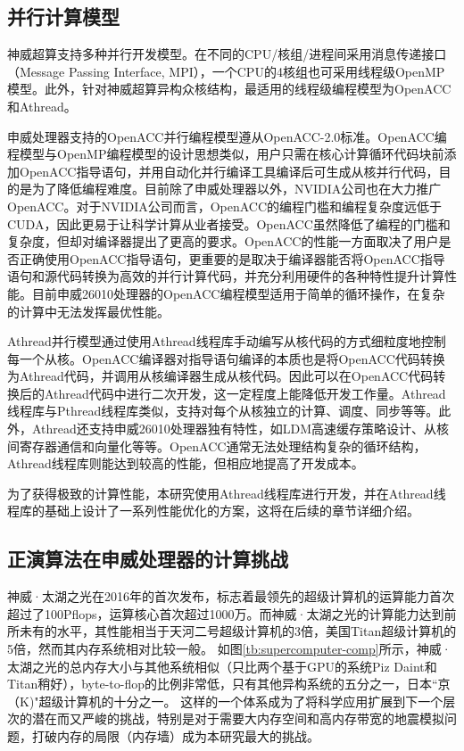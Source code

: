 
\subsection{并行计算模型} %
\label{sub:并行计算模型}



神威超算支持多种并行开发模型。在不同的CPU/核组/进程间采用消息传递接口（Message Passing Interface, MPI），一个CPU的4核组也可采用线程级OpenMP模型。此外，针对神威超算异构众核结构，最适用的线程级编程模型为OpenACC和Athread。

申威处理器支持的OpenACC并行编程模型遵从OpenACC-2.0标准。OpenACC编程模型与OpenMP编程模型的设计思想类似，用户只需在核心计算循环代码块前添加OpenACC指导语句，并用自动化并行编译工具编译后可生成从核并行代码，目的是为了降低编程难度。目前除了申威处理器以外，NVIDIA公司也在大力推广OpenACC。对于NVIDIA公司而言，OpenACC的编程门槛和编程复杂度远低于CUDA，因此更易于让科学计算从业者接受。OpenACC虽然降低了编程的门槛和复杂度，但却对编译器提出了更高的要求。OpenACC的性能一方面取决了用户是否正确使用OpenACC指导语句，更重要的是取决于编译器能否将OpenACC指导语句和源代码转换为高效的并行计算代码，并充分利用硬件的各种特性提升计算性能。目前申威26010处理器的OpenACC编程模型适用于简单的循环操作，在复杂的计算中无法发挥最优性能。


Athread并行模型通过使用Athread线程库手动编写从核代码的方式细粒度地控制每一个从核。OpenACC编译器对指导语句编译的本质也是将OpenACC代码转换为Athread代码，并调用从核编译器生成从核代码。因此可以在OpenACC代码转换后的Athread代码中进行二次开发，这一定程度上能降低开发工作量。Athread线程库与Pthread线程库类似，支持对每个从核独立的计算、调度、同步等等。此外，Athread还支持申威26010处理器独有特性，如LDM高速缓存策略设计、从核间寄存器通信和向量化等等。OpenACC通常无法处理结构复杂的循环结构，Athread线程库则能达到较高的性能，但相应地提高了开发成本。

为了获得极致的计算性能，本研究使用Athread线程库进行开发，并在Athread线程库的基础上设计了一系列性能优化的方案，这将在后续的章节详细介绍。


\subsection{正演算法在申威处理器的计算挑战} %

神威·太湖之光在2016年的首次发布\citep{fu2016sunway}，标志着最领先的超级计算机的运算能力首次超过了100Pflops，运算核心首次超过1000万。而神威·太湖之光的计算能力达到前所未有的水平，其性能相当于天河二号超级计算机的3倍，美国Titan超级计算机的5倍，然而其内存系统相对比较一般。 如图\ref{tb:supercomputer-comp}所示，神威·太湖之光的总内存大小与其他系统相似（只比两个基于GPU的系统Piz Daint和Titan稍好），byte-to-flop的比例非常低，只有其他异构系统的五分之一，日本“京（K)"超级计算机的十分之一。 这样的一个体系成为了将科学应用扩展到下一个层次的潜在而又严峻的挑战，特别是对于需要大内存空间和高内存带宽的地震模拟问题，打破内存的局限（内存墙）成为本研究最大的挑战。

